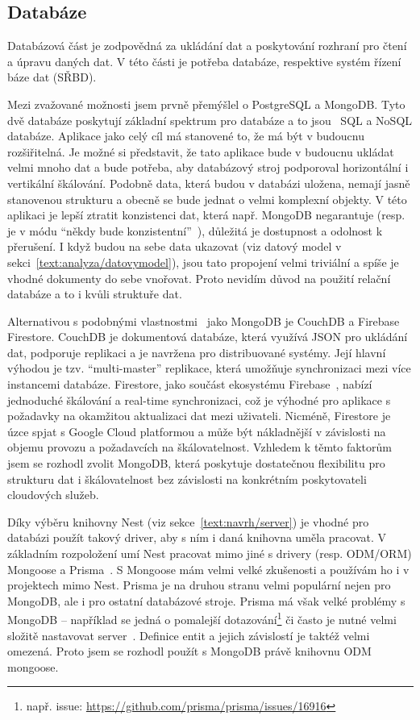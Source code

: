 \subsection{Databáze}\label{text:navrh/databaze}

Databázová část je zodpovědná za ukládání dat a poskytování rozhraní pro čtení a úpravu daných dat. 
V této části je potřeba databáze, respektive systém řízení báze dat (SŘBD).

Mezi zvažované možnosti jsem prvně přemýšlel o PostgreSQL a MongoDB.
Tyto dvě databáze poskytují základní spektrum pro databáze a to jsou~\cite{irena2015big, marek2018sql} SQL a NoSQL databáze. 
Aplikace jako celý cíl má stanovené to, že má být v budoucnu rozšiřitelná.
Je možné si představit, že tato aplikace bude v budoucnu ukládat velmi mnoho dat a bude potřeba, aby databázový stroj podporoval horizontální i vertikální škálování.
Podobně data, která budou v databázi uložena, nemají jasně stanovenou strukturu a obecně se bude jednat o velmi komplexní objekty.
V této aplikaci je lepší ztratit konzistenci dat, která např. MongoDB negarantuje (resp. je v módu \enquote{někdy bude konzistentní}~\cite{irena2015big}), důležitá je dostupnost a odolnost k přerušení.
I když budou na sebe data ukazovat (viz datový model v sekci~\ref{text:analyza/datovymodel}), jsou tato propojení velmi triviální a spíše je vhodné dokumenty do sebe vnořovat.
Proto nevidím důvod na použití relační databáze a to i kvůli struktuře dat.

Alternativou s podobnými vlastnostmi~\cite{irena2015big} jako MongoDB je CouchDB a Firebase Firestore. 
CouchDB je dokumentová databáze, která využívá JSON pro ukládání dat, podporuje replikaci a je navržena pro distribuované systémy. 
Její hlavní výhodou je tzv. \enquote{multi-master} replikace, která umožňuje synchronizaci mezi více instancemi databáze. 
Firestore, jako součást ekosystému Firebase~\cite{firebase}, nabízí jednoduché škálování a real-time synchronizaci, což je výhodné pro aplikace s požadavky na okamžitou aktualizaci dat mezi uživateli. 
Nicméně, Firestore je úzce spjat s Google Cloud platformou a může být nákladnější v závislosti na objemu provozu a požadavcích na škálovatelnost. 
Vzhledem k těmto faktorům jsem se rozhodl zvolit MongoDB, která poskytuje dostatečnou flexibilitu pro strukturu dat i škálovatelnost bez závislosti na konkrétním poskytovateli cloudových služeb.

Díky výběru knihovny Nest (viz sekce~\ref{text:navrh/server}) je vhodné pro databázi použít takový driver, aby s ním i daná knihovna uměla pracovat.
V základním rozpoložení umí Nest pracovat mimo jiné s drivery (resp. ODM/ORM) Mongoose a Prisma~\cite{nest_database}.
S Mongoose mám velmi velké zkušenosti a používám ho i v projektech mimo Nest.
Prisma je na druhou stranu velmi populární nejen pro MongoDB, ale i pro ostatní databázové stroje.
Prisma má však velké problémy s MongoDB -- například se jedná o pomalejší dotazování\footnote{např. issue: \url{https://github.com/prisma/prisma/issues/16916}} či často je nutné velmi složitě nastavovat server~\cite{prisma_2025}.
Definice entit a jejich závislostí je taktéž velmi omezená.
Proto jsem se rozhodl použít s MongoDB právě knihovnu ODM mongoose.

